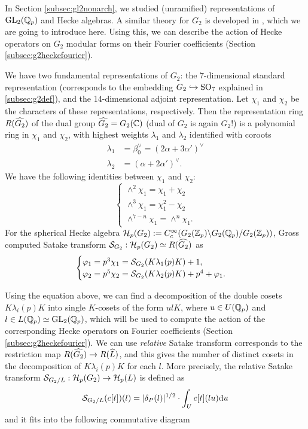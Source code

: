 In Section \ref{subsec:gl2nonarch}, we studied (unramified) representations of $\mathrm{GL}_{2}(\mathbb{Q}_p)$ and Hecke algebras.
A similar theory for $G_2$ is developed in \cite{gan2002fourier}, which we are going to introduce here.
Using this, we can describe the action of Hecke operators on $G_2$ modular forms on their Fourier coefficients (Section \ref{subsec:g2heckefourier}).

We have two fundamental representations of $G_2$: the 7-dimensional standard representation (corresponds to the embedding $G_2 \hookrightarrow \mathrm{SO}_7$ explained in \ref{subsec:g2def}), and the 14-dimensional adjoint representation.
Let $\chi_1$ and $\chi_2$ be the characters of these representations, respectively.
Then the representation ring $R(\widehat{G_2})$ of the dual group $\widehat{G_2} = G_2(\mathbb{C})$ (dual of $G_2$ is again $G_2$!) is a polynomial ring in $\chi_1$ and $\chi_2$, with highest weights $\lambda_1$ and $\lambda_2$ identified with coroots
\begin{align*}
    \lambda_1 &= \beta_0^\vee = (2\alpha + 3 \alpha')^\vee \\
    \lambda_2 &= (\alpha + 2 \alpha')^\vee.
\end{align*}
We have the following identities between $\chi_1$ and $\chi_2$:
$$
\begin{cases}
    \wedge^2 \chi_1 = \chi_1 + \chi_2 \\
    \wedge^3 \chi_1 = \chi_1^2 - \chi_2 \\
    \wedge^{7-n} \chi_1 = \wedge^n \chi_1.
\end{cases}
$$
For the spherical Hecke algebra $\mathcal{H}_p(G_2):= C_c^\infty(G_2(\mathbb{Z}_p) \backslash G_2(\mathbb{Q}_p) / G_2(\mathbb{Z}_p))$, Gross \cite{gross1998satake} computed Satake transform $\mathcal{S}_{G_2}: \mathcal{H}_p(G_2) \simeq R(\widehat{G_2})$ as
$$
\begin{cases}
    \varphi_1 = p^3 \chi_1 = \mathcal{S}_{G_2}(K \lambda_1(p) K) + 1, \\
    \varphi_2 = p^5 \chi_2 = \mathcal{S}_{G_2}(K \lambda_2(p) K) + p^4 + \varphi_1.
\end{cases}
$$


Using the equation above, we can find a decomposition of the double cosets $K \lambda_i(p) K$ into single $K$-cosets of the form $ulK$, where $u \in U(\mathbb{Q}_p)$ and $l \in L(\mathbb{Q}_p) \simeq \mathrm{GL}_2(\mathbb{Q}_p)$, which will be used to compute the action of the corresponding Hecke operators on Fourier coefficients (Section \ref{subsec:g2heckefourier}).
We can use \emph{relative} Satake transform corresponds to the restriction map $R(\widehat{G_2}) \to R(\widehat{L})$, and this gives the number of distinct cosets in the decomposition of $K \lambda_i(p) K$ for each $l$.
More precisely, the relative Satake transform $\mathcal{S}_{G_2 / L} : \mathcal{H}_p(G_2) \to \mathcal{H}_p(L)$ is defined as
$$
\mathcal{S}_{G_2 / L}(c[t])(l) = |\delta_P(l)|^{1/2} \cdot \int_{U} c[t](lu) \mathrm{d} u
$$
and it fits into the following commutative diagram
\begin{center}
\end{center}

